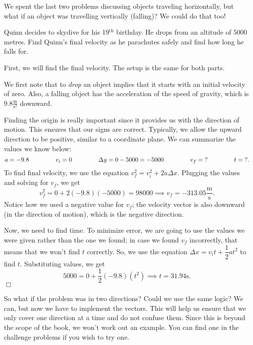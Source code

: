 \documentclass[lang=en,11pt]{elegantbook}
\begin{document}
We spent the last two problems discussing objects traveling horizontally, but what if an object was travelling vertically (falling)? We could do that too!
\begin{example}
Quinn decides to skydive for his 19$^\text{th}$ birthday. He drops from an altitude of $5000$ metres.  Find Quinn's final velocity as he parachutes safely and find how long he falls for.
\end{example}
\begin{solution}
First, we will find the final velocity.  The setup is the same for both parts.

We first note that to \textit{drop} an object implies that it starts with an initial velocity of zero.  Also, a falling object has the acceleration of the speed of gravity, which is $9.8\frac{\text{m}}{\text{s}^2}$ downward.

Finding the origin is really important since it provides us with the direction of motion.  This ensures that our signs are correct.  Typically, we allow the upward direction to be positive, similar to a coordinate plane.  We can summarize the values we know below: $$a=-9.8 \hspace{15mm} v_i=0 \hspace{15mm} \Delta y=0-5000=-5000 \hspace{15mm} v_f=\text{?} \hspace{15mm} t=\text{?}.$$ To find final velocity, we use the equation $v_f^2=v_i^2+2a\Delta x$.  Plugging the values and solving for $v_f$, we get $$v_f^2=0+2(-9.8)(-5000)=98000 \implies v_f=-313.05\frac{\text{m}}{\text{s}}.$$ Notice how we used a negative value for $v_f$; the velocity vector is also downward (in the direction of motion), which is the negative direction.

Now, we need to find time.  To minimize error, we are going to use the values we were given rather than the one we found; in case we found $v_f$ incorrectly, that means that we won't find $t$ correctly. So, we use the equation $\Delta x=v_it+\dfrac{1}{2}at^2$ to find $t$.  Substituting values, we get $$5000=0+\dfrac{1}{2}(-9.8)(t^2) \implies t=31.94\text{s}.$$ $\Box$
\end{solution}
So what if the problem was in two directions? Could we use the same logic? We can, but now we have to implement the vectors. This will help us ensure that we only cover one direction at a time and do not confuse them.  Since this is beyond the scope of the book, we won't work out an example.  You can find one in the challenge problems if you wish to try one.
\end{document}
